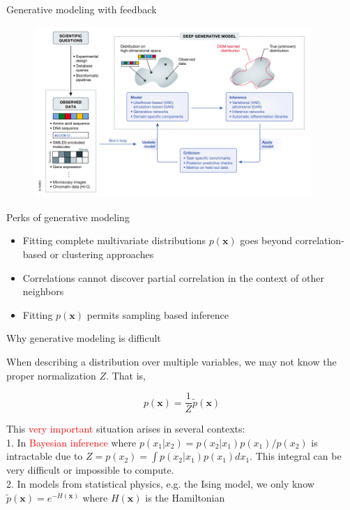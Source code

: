 \documentclass{beamer}					%
\begin{document}
\begin{frame}{Generative modeling with feedback}
\begin{figure}
\includegraphics[height=65mm, width=105mm]{dbm}
\end{figure}
\end{frame}



\begin{frame}{Perks of generative modeling}

\begin{itemize}
\item Fitting complete multivariate distributions $p(\mathbf{x})$ goes beyond correlation-based or clustering approaches
\item Correlations cannot discover partial correlation in the context of other neighbors
\item Fitting $p(\mathbf{x})$ permits sampling based inference
\end{itemize}

\end{frame}

\begin{frame}{Why generative modeling is difficult}

When describing a distribution over multiple variables, we may not know the proper normalization $Z$. That is,

\begin{equation*}
p(\mathbf{x}) = \frac{1}{Z}\tilde{p}(\mathbf{x})
\end{equation*}

\vspace{0.1in}
This \textcolor{red}{very important} situation arises in several contexts:\\
\vspace{0.1in}
1. In \textcolor{red}{Bayesian inference} where $p(x_{1}|x_{2}) = p(x_{2}|x_{1})p(x_{1})/p(x_{2})$ is intractable due to $Z = p(x_{2}) = \int p(x_{2}|x_{1})p(x_{1})dx_{1}$. This integral can be very difficult or impossible to
compute.\\
\vspace{0.1in}
2. In models from statistical physics, e.g. the Ising model, we only know
$\tilde{p}(\mathbf{x}) = e^{−H(\mathbf{x})}$ where $H(\mathbf{x})$ is the Hamiltonian

\end{frame}
\end{document}
